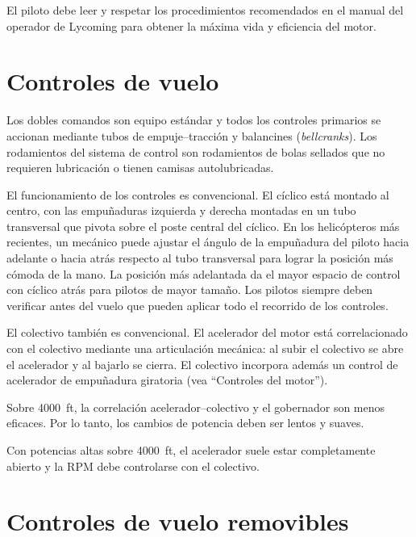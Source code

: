 El piloto debe leer y respetar los procedimientos recomendados en el manual del operador de Lycoming para obtener la máxima vida y eficiencia del motor.

\section{Controles de vuelo}

Los dobles comandos son equipo estándar y todos los controles primarios se accionan mediante tubos de empuje--tracción y balancines (\emph{bellcranks}). Los rodamientos del sistema de control son rodamientos de bolas sellados que no requieren lubricación o tienen camisas autolubricadas.

El funcionamiento de los controles es convencional. El cíclico está montado al centro, con las empuñaduras izquierda y derecha montadas en un tubo transversal que pivota sobre el poste central del cíclico. En los helicópteros más recientes, un mecánico puede ajustar el ángulo de la empuñadura del piloto hacia adelante o hacia atrás respecto al tubo transversal para lograr la posición más cómoda de la mano. La posición más adelantada da el mayor espacio de control con cíclico atrás para pilotos de mayor tamaño. Los pilotos siempre deben verificar antes del vuelo que pueden aplicar todo el recorrido de los controles.

El colectivo también es convencional. El acelerador del motor está correlacionado con el colectivo mediante una articulación mecánica: al subir el colectivo se abre el acelerador y al bajarlo se cierra. El colectivo incorpora además un control de acelerador de empuñadura giratoria (vea ``Controles del motor'').

\begin{precaucion}
Sobre 4000~ft, la correlación acelerador--colectivo y el gobernador son menos eficaces. Por lo tanto, los cambios de potencia deben ser lentos y suaves.
\end{precaucion}

\begin{precaucion}
Con potencias altas sobre 4000~ft, el acelerador suele estar completamente abierto y la RPM debe controlarse con el colectivo.
\end{precaucion}

\section{Controles de vuelo removibles}

